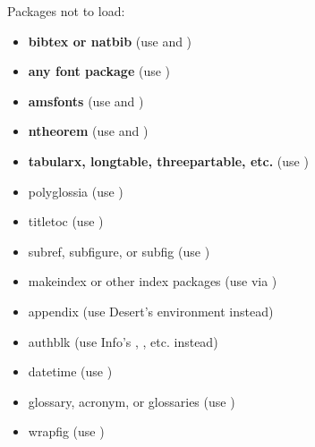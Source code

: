 \begin{BigPages} [hmargin=0.5cm, vmargin=1cm]
Packages not to load:

\begin{itemize}
\item \textbf{bibtex or natbib} (use  and )
\item \textbf{any font package} (use )
\item \textbf{amsfonts} (use  and )
\item \textbf{ntheorem} (use  and )
\item \textbf{tabularx, longtable, threepartable, etc.} (use )
\item polyglossia (use )
\item titletoc (use )
\item subref, subfigure, or subfig (use )
\item makeindex or other index packages (use  via )
\item appendix (use Desert's environment instead)
\item authblk (use Info's , , etc. instead)
\item datetime (use )
\item glossary, acronym, or glossaries (use )
\item wrapfig (use )
\end{itemize}




\end{BigPages}
